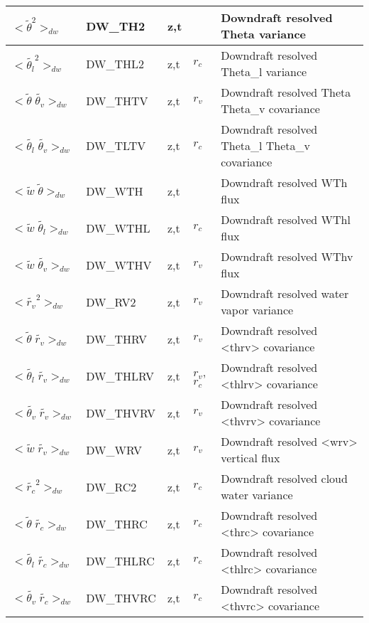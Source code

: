 \begin{longtable}[c]{|p{}|p{}|p{}|p{}|p{}|}
$<{\tilde{\theta}^2}>_{dw}$                   & DW\_TH2   & z,t   &       & Downdraft resolved Theta variance \\\hline
$<{\tilde{\theta_l}^2}>_{dw}$                 & DW\_THL2  & z,t   & $r_c$ & Downdraft resolved Theta\_l variance \\\hline
$<{\tilde{\theta}\;\tilde{\theta_v}}>_{dw}$   & DW\_THTV  & z,t   & $r_v$ & Downdraft resolved Theta Theta\_v covariance \\\hline
$<{\tilde{\theta_l}\;\tilde{\theta_v}}>_{dw}$ & DW\_TLTV  & z,t   & $r_c$ & Downdraft resolved Theta\_l Theta\_v covariance \\\hline
$<{\tilde{w}\;\tilde{\theta}}>_{dw}$          & DW\_WTH   & z,t   &       & Downdraft resolved WTh flux \\\hline
$<{\tilde{w}\;\tilde{\theta_l}}>_{dw}$        & DW\_WTHL  & z,t   & $r_c$ & Downdraft resolved WThl flux\\\hline
$<{\tilde{w}\;\tilde{\theta_v}}>_{dw}$        & DW\_WTHV  & z,t   & $r_v$ & Downdraft resolved WThv flux \\\hline
$<{\tilde{r_v}}^2>_{dw}$                      & DW\_RV2   & z,t   & $r_v$ & Downdraft resolved water vapor variance \\\hline
$<{\tilde{\theta}\;\tilde{r_v}}>_{dw}$        & DW\_THRV  & z,t   & $r_v$ & Downdraft resolved <thrv> covariance \\\hline
$<{\tilde{\theta_l}\;\tilde{r_v}}>_{dw}$      & DW\_THLRV & z,t   & $r_v$, $r_c$ & Downdraft resolved <thlrv> covariance \\\hline
$<{\tilde{\theta_v}\;\tilde{r_v}}>_{dw}$      & DW\_THVRV & z,t   & $r_v$ & Downdraft resolved <thvrv> covariance \\\hline
$<{\tilde{w}\;\tilde{r_v}}>_{dw}$             & DW\_WRV   & z,t   & $r_v$ & Downdraft resolved <wrv> vertical flux \\\hline
$<{\tilde{r_c}}^2>_{dw}$                      & DW\_RC2   & z,t   & $r_c$ & Downdraft resolved cloud water variance \\\hline
$<{\tilde{\theta}\;\tilde{r_c}}>_{dw}$        & DW\_THRC  & z,t   & $r_c$ & Downdraft resolved <thrc> covariance \\\hline
$<{\tilde{\theta_l}\;\tilde{r_c}}>_{dw}$      & DW\_THLRC & z,t   & $r_c$ & Downdraft resolved <thlrc> covariance \\\hline
$<{\tilde{\theta_v}\;\tilde{r_c}}>_{dw}$      & DW\_THVRC & z,t   & $r_c$ & Downdraft resolved <thvrc> covariance \\\hline

\end{longtable}
